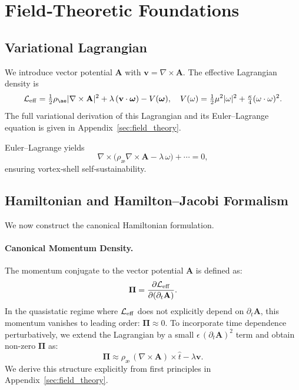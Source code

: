 \documentclass[preprint,notitlepage]{revtex4-2}
\begin{document}
\section{Field‐Theoretic Foundations}
    \subsection{Variational Lagrangian}
    We introduce vector potential $\mathbf A$ with $\mathbf v=\nabla\times\mathbf A$. The effective Lagrangian density is
    \[
      \mathcal L_{\rm eff}=\tfrac12\rho_{æ}|\nabla\times\mathbf A|^2+\lambda\,(\mathbf v\cdot\boldsymbol\omega)-V(\boldsymbol\omega),
      \quad V(\omega)=\tfrac12\mu^2|\omega|^2+\tfrac\kappa4(\omega\cdot\omega)^2.
    \]
    The full variational derivation of this Lagrangian and its Euler–Lagrange equation is given in Appendix~\ref{sec:field_theory}.

    Euler–Lagrange yields
    \[
      \nabla\times\bigl(\rho_{æ}\nabla\times\mathbf A-\lambda\,\omega\bigr)+\cdots=0,
    \]
    ensuring vortex‐shell self‐sustainability.

    \subsection{Hamiltonian and Hamilton–Jacobi Formalism}

    We now construct the canonical Hamiltonian formulation.

    \paragraph{Canonical Momentum Density.}
    The momentum conjugate to the vector potential $\mathbf A$ is defined as:
    \begin{equation}
      \boldsymbol\Pi = \frac{\partial \mathcal{L}_{\rm eff}}{\partial (\partial_t \mathbf A)}.
    \end{equation}
    In the quasistatic regime where $\mathcal{L}_{\rm eff}$ does not explicitly depend on $\partial_t \mathbf A$, this momentum vanishes to leading order: $\boldsymbol\Pi \approx 0$. To incorporate time dependence perturbatively, we extend the Lagrangian by a small $\epsilon\,(\partial_t \mathbf A)^2$ term and obtain non-zero $\boldsymbol\Pi$ as:
    \begin{equation}
      \boldsymbol\Pi \approx \rho_{æ}\,(\nabla \times \mathbf A) \times \hat t - \lambda \mathbf v.
    \end{equation}
    We derive this structure explicitly from first principles in Appendix~\ref{sec:field_theory}.
\end{document}
